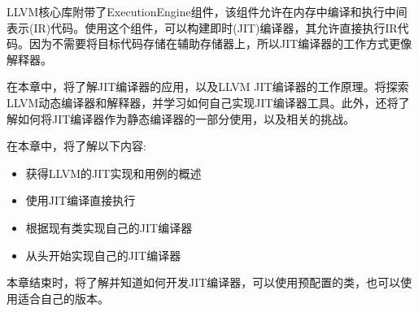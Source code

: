 
LLVM核心库附带了ExecutionEngine组件，该组件允许在内存中编译和执行中间表示(IR)代码。使用这个组件，可以构建即时(JIT)编译器，其允许直接执行IR代码。因为不需要将目标代码存储在辅助存储器上，所以JIT编译器的工作方式更像解释器。

在本章中，将了解JIT编译器的应用，以及LLVM JIT编译器的工作原理。将探索LLVM动态编译器和解释器，并学习如何自己实现JIT编译器工具。此外，还将了解如何将JIT编译器作为静态编译器的一部分使用，以及相关的挑战。

在本章中，将了解以下内容:

\begin{itemize}
\item
获得LLVM的JIT实现和用例的概述

\item
使用JIT编译直接执行

\item
根据现有类实现自己的JIT编译器

\item
从头开始实现自己的JIT编译器
\end{itemize}

本章结束时，将了解并知道如何开发JIT编译器，可以使用预配置的类，也可以使用适合自己的版本。





















